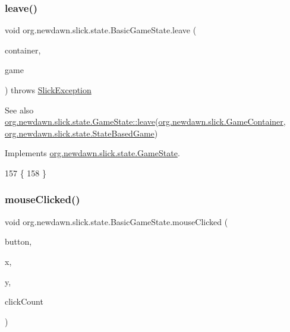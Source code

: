 \subsubsection{\texorpdfstring{leave()}{leave()}}
{\footnotesize\ttfamily void org.\+newdawn.\+slick.\+state.\+Basic\+Game\+State.\+leave (\begin{DoxyParamCaption}\item[{\mbox{\hyperlink{classorg_1_1newdawn_1_1slick_1_1_game_container}{Game\+Container}}}]{container,  }\item[{\mbox{\hyperlink{classorg_1_1newdawn_1_1slick_1_1state_1_1_state_based_game}{State\+Based\+Game}}}]{game }\end{DoxyParamCaption}) throws \mbox{\hyperlink{classorg_1_1newdawn_1_1slick_1_1_slick_exception}{Slick\+Exception}}\hspace{0.3cm}{\ttfamily [inline]}}

\begin{DoxySeeAlso}{See also}
\mbox{\hyperlink{interfaceorg_1_1newdawn_1_1slick_1_1state_1_1_game_state_a3198498951e2674dac79b3c81f7af0f0}{org.\+newdawn.\+slick.\+state.\+Game\+State\+::leave}}(\mbox{\hyperlink{classorg_1_1newdawn_1_1slick_1_1_game_container}{org.\+newdawn.\+slick.\+Game\+Container}}, \mbox{\hyperlink{classorg_1_1newdawn_1_1slick_1_1state_1_1_state_based_game}{org.\+newdawn.\+slick.\+state.\+State\+Based\+Game}}) 
\end{DoxySeeAlso}


Implements \mbox{\hyperlink{interfaceorg_1_1newdawn_1_1slick_1_1state_1_1_game_state_a3198498951e2674dac79b3c81f7af0f0}{org.\+newdawn.\+slick.\+state.\+Game\+State}}.


\begin{DoxyCode}
157                                                                                           \{
158     \}
\end{DoxyCode}
\mbox{\label{classorg_1_1newdawn_1_1slick_1_1state_1_1_basic_game_state_a6151f33238ecd2109e2a2e6a2eda7c90}} 
\subsubsection{\texorpdfstring{mouse\+Clicked()}{mouseClicked()}}
{\footnotesize\ttfamily void org.\+newdawn.\+slick.\+state.\+Basic\+Game\+State.\+mouse\+Clicked (\begin{DoxyParamCaption}\item[{int}]{button,  }\item[{int}]{x,  }\item[{int}]{y,  }\item[{int}]{click\+Count }\end{DoxyParamCaption})\hspace{0.3cm}{\ttfamily [inline]}}

